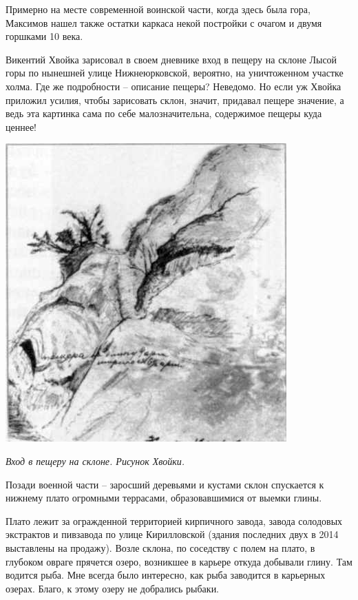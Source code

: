 Примерно на месте современной воинской части, когда здесь была гора, Максимов нашел также остатки каркаса некой постройки с очагом и двумя горшками 10 века.

Викентий Хвойка зарисовал в своем дневнике вход в пещеру на склоне Лысой горы по нынешней улице Нижнеюрковской, вероятно, на уничтоженном участке холма. Где же подробности – описание пещеры? Неведомо. Но если уж Хвойка приложил усилия, чтобы зарисовать склон, значит, придавал пещере значение, а ведь эта картинка сама по себе малозначительна, содержимое пещеры куда ценнее!

\newpage
 
\begin{center}
\includegraphics[width=\linewidth]{chast-kirvys/lys/hv-pesh.jpg}

\textit{Вход в пещеру на склоне. Рисунок Хвойки.}
\end{center} 

Позади военной части – заросший деревьями и кустами склон спускается к нижнему плато огромными террасами, образовавшимися от выемки глины.

Плато лежит за огражденной территорией кирпичного завода, завода солодовых экстрактов и пивзавода по улице Кирилловской (здания последних двух в 2014 выставлены на продажу). Возле склона, по соседству с полем на плато, в глубоком овраге прячется озеро, возникшее в карьере откуда добывали глину. Там водится рыба. Мне всегда было интересно, как рыба заводится в карьерных озерах. Благо, к этому озеру не добрались рыбаки.

